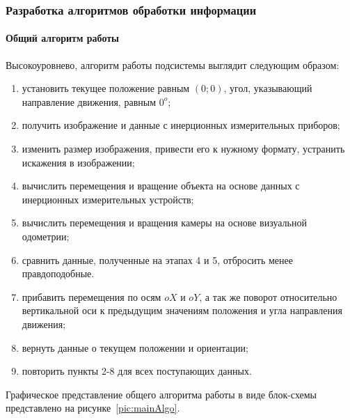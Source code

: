 \subsubsection{Разработка алгоритмов обработки информации}
\paragraph{Общий алгоритм работы}

Высокоуровнево, алгоритм работы подсистемы выглядит следующим образом:
\begin{enumerate}
\item установить текущее положение равным $(0; 0)$, угол, указывающий направление движения, равным $0^{o}$;
\item получить изображение и данные с инерционных измерительных приборов;
\item изменить размер изображения, привести его к нужному формату, устранить искажения в изображении;
\item вычислить перемещения и вращение объекта на основе данных с инерционных измерительных устройств;
\item вычислить перемещения и вращения камеры на основе визуальной одометрии;
\item сравнить данные, полученные на этапах 4 и 5, отбросить менее правдоподобные.
\item прибавить перемещения по осям $oX$ и $oY$, а так же поворот относительно вертикальной оси к предыдущим значениям положения и угла направления движения;
\item вернуть данные о текущем положении и ориентации;
\item повторить пункты 2-8 для всех поступающих данных.
\end{enumerate}

Графическое представление общего алгоритма работы в виде блок-схемы представлено на рисунке~\ref{pic:mainAlgo}.

